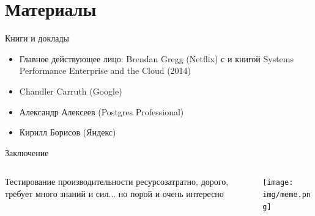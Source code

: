 \section{Материалы}
\begin{frame}{Книги и доклады}
	\begin{itemize}
		\item Главное действующее лицо: Brendan Gregg (Netflix) с  \href{http://www.brendangregg.com/index.html}{} и книгой Systems Performance Enterprise and the Cloud (2014)
		\item Chandler Carruth (Google) \href{https://youtu.be/nXaxk27zwlk}{}
		\item Александр Алексеев (Postgres Professional)  \href{https://youtu.be/0NU07havVD0}{}
		\item Кирилл Борисов (Яндекс)  \href{https://youtu.be/pa_kAkXuOyA}{}
	\end{itemize}
\end{frame}

\begin{frame}{Заключение}
	\begin{columns}
		\begin{column}{.3\textwidth}
			Тестирование производительности ресурсозатратно, дорого, требует много знаний и сил... но порой и очень интересно
		\end{column}
		\begin{column}{.7\textwidth}
		\begin{flushright}
				\texttt{[image: img/meme.png]}
		\end{flushright}
		\end{column}
	\end{columns}

\end{frame}